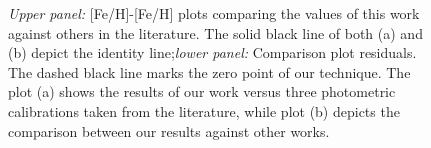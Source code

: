 \documentclass{aa}
\begin{document}
\begin{figure}[]
\begin{center}
\end{center}
\caption{\textit{Upper panel:} [Fe/H]-[Fe/H] plots comparing the values of this work against others in the literature. The solid black line of both (a) and (b) depict the identity line;\textit{lower panel:} Comparison plot residuals. The dashed black line marks the zero point of our technique. The plot (a) shows the results of our work versus three photometric calibrations taken from the literature, while plot (b) depicts the comparison between our results against other works.}
\label{fig:compfeh}
\end{figure}
\end{document}
